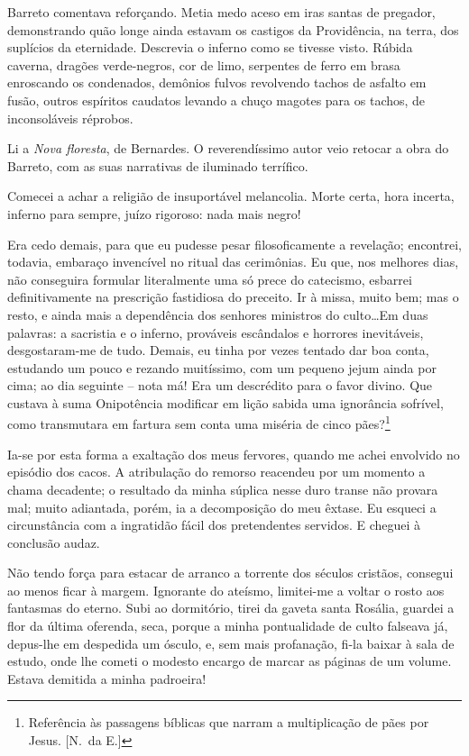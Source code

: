 Barreto comentava reforçando. Metia medo aceso em iras santas de pregador,
demonstrando quão longe ainda estavam os castigos da Providência, na
terra, dos suplícios da eternidade. Descrevia o inferno como se tivesse
visto. Rúbida caverna, dragões verde{}-negros, cor de limo, serpentes
de ferro em brasa enroscando os condenados, demônios fulvos revolvendo
tachos de asfalto em fusão, outros espíritos caudatos levando a chuço
magotes para os tachos, de inconsoláveis réprobos. 

Li a \textit{Nova floresta}, de Bernardes. O reverendíssimo autor 
veio retocar a obra do Barreto, com as suas narrativas de iluminado terrífico. 

Comecei a achar a religião de insuportável melancolia. Morte certa, 
hora incerta, inferno para sempre, juízo rigoroso: nada mais negro! 

Era cedo demais, para que
eu pudesse pesar filosoficamente a revelação; encontrei, todavia,
embaraço invencível no ritual das cerimônias. Eu que, nos melhores
dias, não conseguira formular literalmente uma só prece do catecismo,
esbarrei definitivamente na prescrição fastidiosa do preceito. Ir à
missa, muito bem; mas o resto, e ainda mais a dependência dos senhores
ministros do culto\ldots Em duas palavras: a sacristia e o inferno,
prováveis escândalos e horrores inevitáveis, desgostaram{}-me de tudo.
Demais, eu tinha por vezes tentado dar boa conta, estudando um pouco e
rezando muitíssimo, com um pequeno jejum ainda por cima; ao dia
seguinte -- nota má! Era um descrédito para o favor divino. Que
custava à suma Onipotência modificar em lição sabida uma ignorância
sofrível, como transmutara em fartura sem conta uma miséria de cinco pães?\footnote{ Referência às passagens 
bíblicas que narram a multiplicação de pães por Jesus. [N.~da E.]}

Ia{}-se por esta forma a exaltação dos meus fervores, quando me
achei envolvido no episódio dos cacos. A atribulação do remorso
reacendeu por um momento a chama decadente; o resultado da minha
súplica nesse duro transe não provara mal; muito adiantada, porém, ia a
decomposição do meu êxtase. Eu esqueci a circunstância com a ingratidão
fácil dos pretendentes servidos. E cheguei à conclusão audaz. 

Não tendo força para estacar de arranco a torrente dos séculos cristãos, consegui
ao menos ficar à margem. Ignorante do ateísmo, limitei{}-me a voltar o
rosto aos fantasmas do eterno. Subi ao dormitório, tirei da gaveta
santa Rosália, guardei a flor da última oferenda, seca, porque a minha
pontualidade de culto falseava já, depus{}-lhe em despedida um ósculo,
e, sem mais profanação, fi{}-la baixar à sala de estudo, onde lhe
cometi o modesto encargo de marcar as páginas de um volume. Estava
demitida a minha padroeira!

